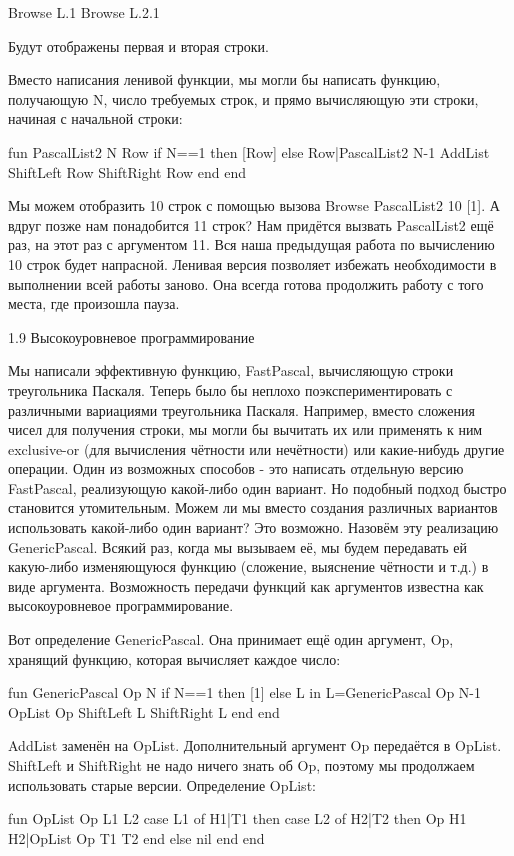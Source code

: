 {Browse L.1}
{Browse L.2.1}

Будут отображены первая и вторая строки.

Вместо написания ленивой функции, мы могли бы написать функцию, получающую N, число требуемых строк, и прямо вычисляющую эти строки, начиная с начальной строки:

fun {PascalList2 N Row}
if N==1 then [Row]
else
Row|{PascalList2 N-1
{AddList {ShiftLeft Row}
{ShiftRight Row}}}
end
end

Мы можем отобразить 10 строк с помощью вызова {Browse {PascalList2 10 [1]}}. А вдруг позже нам понадобится 11 строк? Нам придётся вызвать PascalList2 ещё раз, на этот раз с аргументом 11. Вся наша предыдущая работа по вычислению 10 строк будет напрасной. Ленивая версия позволяет избежать необходимости в выполнении всей работы заново. Она всегда готова продолжить работу с того места, где произошла пауза.

1.9 Высокоуровневое программирование

Мы написали эффективную функцию, FastPascal, вычисляющую строки треугольника Паскаля. Теперь было бы неплохо поэкспериментировать с различными вариациями треугольника Паскаля. Например, вместо сложения чисел для получения строки, мы могли бы вычитать их или применять к ним exclusive-or (для вычисления чётности или нечётности) или какие-нибудь другие операции. Один из возможных способов - это написать отдельную версию FastPascal, реализующую какой-либо один вариант. Но подобный подход быстро становится утомительным. Можем ли мы вместо создания различных вариантов использовать какой-либо один вариант? Это возможно. Назовём эту реализацию GenericPascal. Всякий раз, когда мы вызываем её, мы будем передавать ей какую-либо изменяющуюся функцию (сложение, выяснение чётности и т.д.) в виде аргумента. Возможность передачи функций как аргументов известна как высокоуровневое программирование.

Вот определение GenericPascal. Она принимает ещё один аргумент, Op, хранящий функцию, которая вычисляет каждое число:

fun {GenericPascal Op N}
if N==1 then [1]
else L in
L={GenericPascal Op N-1}
{OpList Op {ShiftLeft L} {ShiftRight L}}
end
end

AddList заменён на OpList. Дополнительный аргумент Op передаётся в OpList. ShiftLeft и ShiftRight не надо ничего знать об Op, поэтому мы продолжаем использовать старые версии. Определение OpList:

fun {OpList Op L1 L2}
case L1 of H1|T1 then
case L2 of H2|T2 then
{Op H1 H2}|{OpList Op T1 T2}
end
else nil end
end


